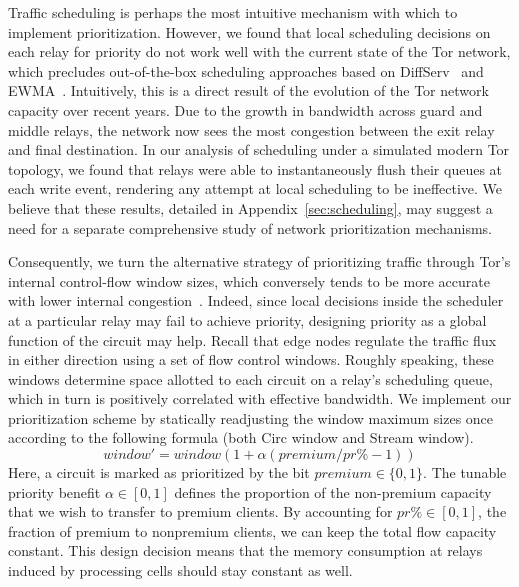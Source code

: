 Traffic scheduling is perhaps the most intuitive mechanism with which to
implement prioritization. However, we found that local scheduling decisions on
each relay for priority do not work well with the current state of the Tor
network, which precludes out-of-the-box scheduling approaches based on
DiffServ~\cite{dovrolis1999case} and EWMA~\cite{tang2010improved}. Intuitively,
this is a direct result of the evolution of the Tor network capacity over recent
years. Due to the growth in bandwidth across guard and middle relays, the
network now sees the most congestion between the exit relay and final
destination. In our analysis of scheduling under a simulated modern Tor
topology, we found that relays were able to instantaneously flush their queues
at each write event, rendering any attempt at local scheduling to be
ineffective. We believe that these results, detailed in
Appendix~\ref{sec:scheduling}, may suggest a need for a separate comprehensive
study of network prioritization mechanisms.

Consequently, we turn the alternative strategy of prioritizing traffic through
Tor's internal control-flow window sizes, which conversely tends to be more
accurate with lower internal congestion~\cite{archive-2009-mail,
  kiraly2008solving}. Indeed, since local decisions inside the scheduler at a
particular relay may fail to achieve priority, designing priority as a global
function of the circuit may help. Recall that edge nodes regulate the traffic
flux in either direction using a set of flow control windows. Roughly speaking,
these windows determine space allotted to each circuit on a relay's scheduling
queue, which in turn is positively correlated with effective bandwidth. We
implement our prioritization scheme by statically readjusting the window maximum
sizes once according to the following formula (both Circ window and Stream
window).
\begin{equation}
  window' = window(1+ \alpha(premium / pr\% - 1))
  \label{eq:flow}
\end{equation}
Here, a circuit is marked as prioritized by the bit $premium \in \{0, 1\}$. The
tunable priority benefit $\alpha \in [0, 1]$ defines the proportion of the
non-premium capacity that we wish to transfer to premium clients. By accounting
for $pr\% \in [0,1]$, the fraction of premium to nonpremium clients, we can keep
the total flow capacity constant. This design decision means that the memory
consumption at relays induced by processing cells should stay constant as well.

